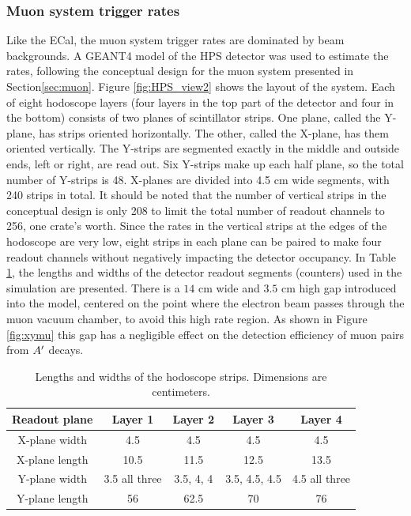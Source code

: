 \subsubsection{Muon system trigger rates}
\label{sec:muontrigg}

Like the ECal, the muon system trigger rates are dominated by beam backgrounds.  
A GEANT4 model of the HPS detector was used to estimate the rates, following the conceptual design for the muon system presented in 
Section\ref{sec:muon}. Figure \ref{fig:HPS_view2} shows the layout of the system. Each of eight hodoscope layers (four layers in 
the top part of the detector and four in the bottom) consists of two planes of scintillator strips. One plane, called the Y-plane, has strips 
oriented horizontally. The other, called the X-plane, has them oriented vertically. The Y-strips are segmented exactly in the middle
and outside ends, left or right, are read out. 
Six Y-strips make up each half plane, so the total number of Y-strips is 48. 
X-planes are divided into 4.5 cm wide segments, with 240 strips in total. It should be noted that the number of vertical strips 
in the conceptual design is only 208 to limit the total number of readout channels to 256, one crate's worth. Since the rates in the 
vertical strips at the edges of the hodoscope are very low, eight strips in each 
plane can be paired to make four readout channels without negatively impacting the detector occupancy. In Table \ref{tb:muonstrp}, 
the lengths and widths of the detector readout segments (counters) used in the simulation are presented. There is a $14$ cm wide 
and $3.5$ cm high gap 
introduced into the model, centered on the point where the electron beam passes through the muon vacuum chamber, to avoid this high rate region.
As shown in Figure \ref{fig:xymu} 
this gap has a negligible effect on the detection efficiency of muon pairs from $A^\prime$ decays. 

\begin{table}[htdp]
\caption{Lengths and widths of the hodoscope strips. Dimensions are centimeters.}
\begin{center}
\begin{tabular}{|c|c|c|c|c|}
\hline\hline
Readout plane& Layer 1&Layer 2&Layer 3& Layer 4 \\
\hline
X-plane width& 4.5& 4.5 & 4.5 & 4.5  \\
X-plane length&10.5&11.5&12.5&13.5\\
\hline
Y-plane width& 3.5 all three&3.5, 4, 4  & 3.5, 4.5, 4.5 & 4.5 all three\\
Y-plane length&56&62.5&70&76\\
\hline\hline
\end{tabular}
\end{center}
\label{tb:muonstrp}
\end{table}%

